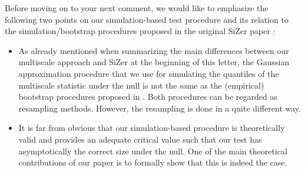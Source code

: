 \documentclass[a4paper,12pt]{article}
\begin{document}
\begin{enumerate}[label=(\arabic*),leftmargin=0.7cm]
%
%

Before moving on to your next comment, we would like to emphasize the following two points on our simulation-based test procedure and its relation to the simulation/bootstrap procedures proposed in the original SiZer paper \citep{ChaudhuriMarron1999}: 
\begin{itemize}[leftmargin=0.5cm]
\item As already mentioned when summarizing the main differences between our multiscale approach and SiZer at the beginning of this letter, the Gaussian approximation procedure that we use for simulating the quantiles of the multiscale statistic under the null is not the same as the (empirical) bootstrap procedures proposed in \cite{ChaudhuriMarron1999, ChaudhuriMarron2000}. Both procedures can be regarded as resampling methods. However, the resampling is done in a quite different way. 
\item It is far from obvious that our simulation-based procedure is theoretically valid and provides an adequate critical value such that our test has asymptotically the correct size under the null. One of the main theoretical contributions of our paper is to formally show that this is indeed the case. 
\end{itemize}



\end{enumerate}
\end{document}
